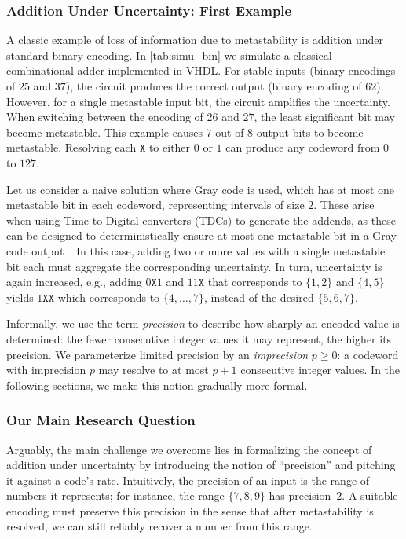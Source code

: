 \documentclass[9pt,journal,compsoc]{IEEEtran}
\theoremstyle{remark}
\newcommand{\mfx}{\mathtt{X}}
\begin{document}
\subsubsection*{Addition Under Uncertainty: First Example}
%
A classic example of loss of information due to metastability
  is addition under standard binary encoding.
In \cref{tab:simu_bin} we simulate a classical combinational adder implemented in VHDL. For stable inputs (binary encodings of $25$ and $37$), the circuit produces the correct output (binary encoding of $62$). However, for a single metastable input bit, the circuit amplifies the uncertainty. When switching between the encoding of $26$ and $27$, the least significant bit may become metastable. 
This example causes $7$ out of $8$ output bits to become metastable.
Resolving each $\mfx$ to either $0$ or $1$ can produce any codeword from $0$ to 
  $127$.

Let us consider a naive solution where Gray code is used, which has at most one metastable bit in each codeword, representing intervals of size $2$. These arise when using Time-to-Digital converters (TDCs) to generate the addends, as these can be designed to deterministically ensure at most one metastable bit in a Gray code output~\cite{fuegger17aware}.
In this case, adding two or more values with a single metastable bit each must aggregate the corresponding uncertainty. In turn, uncertainty is again increased, e.g., adding $0\mfx1$ and $11\mfx$ that corresponds to $\{1,2\}$ and $\{4,5\}$ yields $1\mfx\mfx$ which corresponds to $\{4,\ldots, 7\}$, instead of the desired $\{5,6,7\}$. 

Informally, we use the term \emph{precision} to describe how sharply an encoded value is determined: the fewer consecutive integer values it may represent, the higher its precision. We parameterize limited precision by an \emph{imprecision} $p \geq 0$: a codeword with imprecision $p$ may
resolve to at most $p+1$ consecutive integer values. In the following sections, we make this notion gradually more formal.


\subsubsection*{Our Main Research Question}
%
Arguably, the main challenge we overcome lies in formalizing the concept of addition under uncertainty by
introducing the notion of ``precision'' and pitching it against a code's rate.
Intuitively, the precision of an input is the range of numbers it represents; for instance, the range $\{7,8,9
\}$ has precision~$2$.
A suitable encoding must preserve this precision in the sense that after metastability is resolved, we can still
reliably recover a number from this range.
\end{document}
